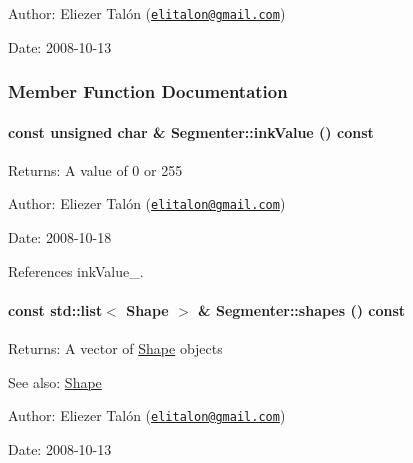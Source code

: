 \begin{Desc}
\item[Author:]Eliezer Talón (\href{mailto:elitalon@gmail.com}{\tt elitalon@gmail.com}) \end{Desc}
\begin{Desc}
\item[Date:]2008-10-13 \end{Desc}


\subsubsection{Member Function Documentation}
\hypertarget{class_segmenter_e9bc56ddcbe5ea4abb40fcc85e3d9fbe}{
\paragraph[inkValue]{\setlength{\rightskip}{0pt plus 5cm}const unsigned char \& Segmenter::inkValue () const}\hfill}
\label{class_segmenter_e9bc56ddcbe5ea4abb40fcc85e3d9fbe}


\begin{Desc}
\item[Returns:]A value of 0 or 255\end{Desc}
\begin{Desc}
\item[Author:]Eliezer Talón (\href{mailto:elitalon@gmail.com}{\tt elitalon@gmail.com}) \end{Desc}
\begin{Desc}
\item[Date:]2008-10-18 \end{Desc}


References inkValue\_\-.\hypertarget{class_segmenter_7ddded12f26e94e6f5cba2752d2c4142}{
\paragraph[shapes]{\setlength{\rightskip}{0pt plus 5cm}const std::list$<$ {\bf Shape} $>$ \& Segmenter::shapes () const}\hfill}
\label{class_segmenter_7ddded12f26e94e6f5cba2752d2c4142}


\begin{Desc}
\item[Returns:]A vector of \hyperlink{class_shape}{Shape} objects\end{Desc}
\begin{Desc}
\item[See also:]\hyperlink{class_shape}{Shape}\end{Desc}
\begin{Desc}
\item[Author:]Eliezer Talón (\href{mailto:elitalon@gmail.com}{\tt elitalon@gmail.com}) \end{Desc}
\begin{Desc}
\item[Date:]2008-10-13 \end{Desc}


